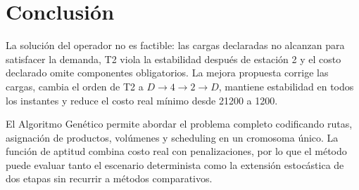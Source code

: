 \documentclass[11pt,letterpaper]{article}
\begin{document}
\section*{Conclusión}

La solución del operador no es factible: las cargas declaradas no alcanzan para satisfacer la
demanda, T2 viola la estabilidad después de estación 2 y el costo declarado omite componentes
obligatorios. La mejora propuesta corrige las cargas, cambia el orden de T2 a \(D\to4\to2\to D\),
mantiene estabilidad en todos los instantes y reduce el costo real mínimo desde 21200 a 1200.

El Algoritmo Genético permite abordar el problema completo codificando rutas, asignación de
productos, volúmenes y scheduling en un cromosoma único. La función de aptitud combina costo
real con penalizaciones, por lo que el método puede evaluar tanto el escenario determinista como
la extensión estocástica de dos etapas sin recurrir a métodos comparativos.
\end{document}
